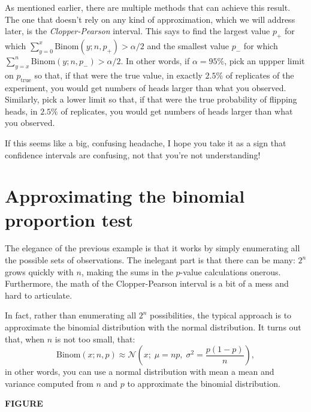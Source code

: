 As mentioned earlier, there are multiple methods that can achieve this result.
The one that doesn't rely on any kind of approximation, which we will address
later, is the \emph{Clopper-Pearson} interval. This says to find the largest
value $p_+$ for which $\sum_{y=0}^x \mathrm{Binom}(y; n, p_+) > \alpha/2$ and
the smallest value $p_-$ for which $\sum_{y=x}^n \mathrm{Binom}(y; n, p_-) >
\alpha/2$. In other words, if $\alpha=95\%$, pick an uppper limit on
$p_\mathrm{true}$ so that, if that were the true value, in exactly $2.5\%$ of
replicates of the experiment, you would get numbers of heads larger than what
you observed. Similarly, pick a lower limit so that, if that were the true
probability of flipping heads, in $2.5\%$ of replicates, you would get numbers
of heads larger than what you observed.

If this seems like a big, confusing headache, I hope you take it as a sign that
confidence intervals are confusing, not that you're not understanding!

\section{Approximating the binomial proportion test}

The elegance of the previous example is that it works by simply enumerating all
the possible sets of observations. The inelegant part is that there can be
many: $2^n$ grows quickly with $n$, making the sums in the $p$-value
calculations onerous. Furthermore, the math of the Clopper-Pearson interval is
a bit of a mess and hard to articulate.

In fact, rather than enumerating all $2^n$ possibilities, the typical approach
is to approximate the binomial distribution with the normal distribution. It turns out that, when $n$ is not too small, that:
\begin{equation}
    \mathrm{Binom}(x; n, p) \approx \mathcal{N}\left(x; \; \mu = np, \; \sigma^2 = \frac{p (1-p)}{n}\right),
\end{equation}
in other words, you can use a normal distribution with mean a mean and variance
computed from $n$ and $p$ to approximate the binomial distribution.

\textbf{FIGURE}


